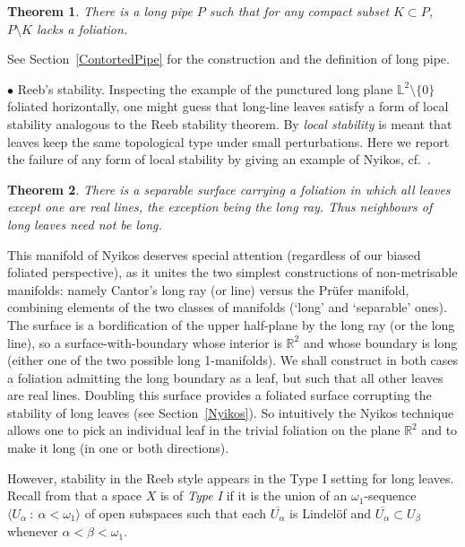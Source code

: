 \documentclass{amsart}
\newtheorem{theorem}{Theorem}[section]
\begin{document}
\begin{theorem}\label{thmpipenonfol}
  There is a long pipe $P$ such that for any compact subset $K\subset P$, $P\setminus K$ lacks a foliation.
\end{theorem}

See Section~\ref{ContortedPipe} for the construction and the definition of long pipe.

\medskip
\noindent$\bullet$ {\sc Reeb's stability.}
Inspecting the example of the punctured long plane ${\mathbb L}^2\setminus\{0\}$ foliated horizontally, one might guess that long-line leaves satisfy a form of local stability analogous to the Reeb stability theorem. 
By \emph{local stability} is meant that leaves keep the same topological type under small perturbations. Here we report the failure of any form of local stability by giving an example of Nyikos, cf.~\cite[Examples~6.3 and 6.7]{Nyikos90}. 

\begin{theorem}\label{thmonelongleaf} 
There is a separable surface carrying a foliation in which all leaves except one are real lines, the exception being the long ray. Thus neighbours of long leaves need not be long.
\end{theorem}

This manifold of Nyikos deserves special attention (regardless of our biased foliated perspective), as it unites the two simplest constructions of non-metrisable manifolds: namely Cantor's long ray (or line) versus the Pr\"ufer manifold, combining elements of the two classes of manifolds (`long' and `separable' ones). The surface is a bordification of the upper half-plane by the long ray (or the long line), so a surface-with-boundary whose interior is ${{\mathbb R}^2}$ and whose boundary is long (either one of the two possible long 1-manifolds). We shall construct in both cases a foliation admitting the long boundary as a leaf, but such that all other leaves are real lines. Doubling this surface provides a foliated surface corrupting the stability of long leaves (see Section~\ref{Nyikos}). So intuitively the Nyikos technique allows one to pick an individual leaf in the trivial foliation on the plane ${\mathbb R}^2$ and to make it long (in one or both directions).

However, stability in the Reeb style appears in the Type I setting for long leaves. Recall from \cite[2.10]{Nyikos84} that a space $X$ is of \emph{Type I} if it is the union of an $\omega_1$-sequence $\langle U_\alpha\ :\ \alpha<\omega_1\rangle$ of open subspaces such that each $\overline{U_\alpha}$ is Lindel\"of and $\overline{U_\alpha}\subset U_\beta$ whenever $\alpha<\beta<\omega_1$.
\end{document}
